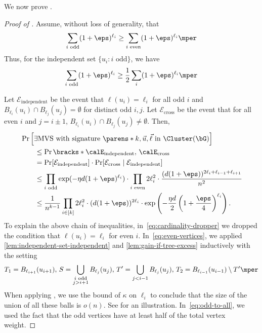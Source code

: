 \documentclass[11pt,letterpaper]{article}
\begin{document}
    We now prove .
    \begin{proof}[Proof of ]
        Assume, without loss of generality, that
        $$\sum_{i\text{ odd}}(1+\eps)^{\ell_i} \ge \sum_{i\text{ even}} (1+\eps)^{\ell_i}\mper$$
        Thus, for the independent set $\{u_i:i\text{ odd}\}$, we have 
        $$\sum_{i\text{ odd}} (1+\eps)^{\ell_i} \ge \frac{1}{2} \sum_{i} (1+\eps)^{\ell_i}\mper$$ 

        Let $\mathcal{E}_{\text{independent}}$ be the event that $\ell(u_i) = \ell_i$ for all odd $i$ and $B_{\ell_i}(u_i) \cap B_{\ell_j}(u_j) = \emptyset$ for distinct odd $i, j$. 
        Let $\mathcal{E}_{\text{cross}}$ be the event that for all even $i$ and $j = i\pm 1$, $B_{\ell_i}(u_i) \cap B_{\ell_{j}}(u_{j}) \ne \emptyset$. Then, 
        \begin{align}
            &\Pr\left[ \exists\text{MVS with signature }\parens*{k,\vec{u},\vec{\ell}} \text{ in }\Cluster(\bG) \right] \nonumber \\
            &\quad\quad \le \Pr\bracks*{\calE_{\text{independent}},\,\calE_{\text{cross}}} \label{eq:cardinality-dropper} \\
            &\quad\quad = \Pr[\mathcal{E}_{\text{independent}}] \cdot \Pr[\mathcal{E}_{\text{cross}} \mid \mathcal{E}_{\text{independent}}] \nonumber \\
            &\quad\quad \le \prod_{i \text{ odd}} \exp(-\eta d (1+\eps)^{\ell_i}) \cdot \prod_{i \text{ even}} 2\ell_i^2 \cdot \frac{(d(1+\eps))^{2\ell_i + \ell_{i-1} + \ell_{i+1}}}{n^2} \label{eq:even-vertices}\\
            &\quad\quad \le \frac{1}{n^{k-1}} \prod_{i \in [k]} 2\ell_i^2 \cdot (d(1+\eps))^{2\ell_i} \cdot \exp\left(-\frac{\eta d}{2} \left(1+\frac{\eps}{4}\right)^{\ell_i}\right) \label{eq:odd-to-all}.
        \end{align}
        To explain the above chain of inequalities, in~\eqref{eq:cardinality-dropper} we dropped the condition that $\ell(u_i) = \ell_i$ for even $i$.
        In~\eqref{eq:even-vertices}, we applied \cref{lem:independent-set-independent} and \cref{lem:gain-if-tree-excess} inductively with the setting
        \[
            T_1 = B_{\ell_{i+1}}(u_{i+1}),\, S = \bigcup_{\substack{i\text{ odd} \\ j > i+1}} B_{\ell_j}(u_j), \, T'=\bigcup_{j < i-1} B_{\ell_j}(u_j), \, T_2 = B_{\ell_{i-1}}(u_{i-1}) \setminus T'\mper
        \]
        When applying , we use the bound of $\kappa$ on $\ell_i$ to conclude that the size of the union of all these balls is $o(n)$.
        See  for an illustration. In~\eqref{eq:odd-to-all}, we used the fact that the odd vertices have at least half of the total vertex weight.
    \end{proof}
\end{document}
